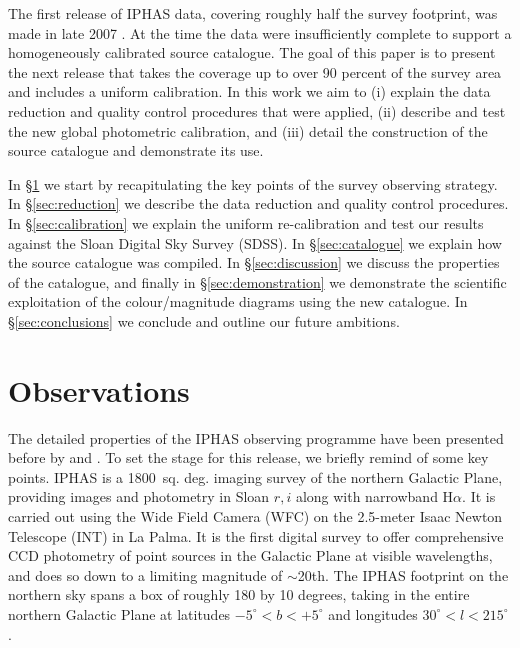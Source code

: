 \documentclass[useAMS,usenatbib]{mn2e}
\begin{document}
The first release of IPHAS data, 
covering roughly half the survey footprint,
was made in late 2007 \citep{Gonzalez-Solares2008}. 
At the time the data were insufficiently complete 
to support a homogeneously calibrated source catalogue.
The goal of this paper is to present the next release 
that takes the coverage up to over 90 percent of the survey area 
and includes a uniform calibration.
In this work we aim to
(i) explain the data reduction 
and quality control procedures that were applied,
(ii) describe and test the new global photometric calibration, and 
(iii) detail the construction of the source catalogue
and demonstrate its use.

In \S\ref{sec:observations} we start by recapitulating the key points
of the survey observing strategy.
In \S\ref{sec:reduction} we describe the data reduction
and quality control procedures.
In \S\ref{sec:calibration} we explain the uniform re-calibration
and test our results against the Sloan Digital Sky Survey (SDSS).
In \S\ref{sec:catalogue} we explain how the source catalogue was compiled.
In \S\ref{sec:discussion} we discuss the properties of the catalogue,
and finally in \S\ref{sec:demonstration} we demonstrate
the scientific exploitation of the colour/magnitude diagrams
using the new catalogue.
In \S\ref{sec:conclusions} we conclude and outline
our future ambitions.


\section{Observations}
\label{sec:observations}

The detailed properties of the IPHAS observing programme 
have been presented before 
by \citet{Drew2005} and \citet{Gonzalez-Solares2008}. 
To set the stage for this release, we briefly remind of some key points.
IPHAS is a 1800~sq. deg. imaging survey of the northern Galactic Plane, 
providing images and photometry in Sloan $r, i$ 
along with narrowband H$\alpha$. 
It is carried out using the Wide Field Camera (WFC) 
on the 2.5-meter Isaac Newton Telescope (INT) in La Palma. 
It is the first digital survey to offer comprehensive CCD photometry
of point sources in the Galactic Plane at visible wavelengths, 
and does so down to a limiting magnitude of $\sim$20th.
The IPHAS footprint on the northern sky spans a box 
of roughly 180 by 10 degrees, 
taking in the entire northern Galactic Plane 
at latitudes $-5^{\circ} < b < +5^{\circ}$ 
and longitudes $30^{\circ} < l < 215^{\circ}$.
\end{document}
